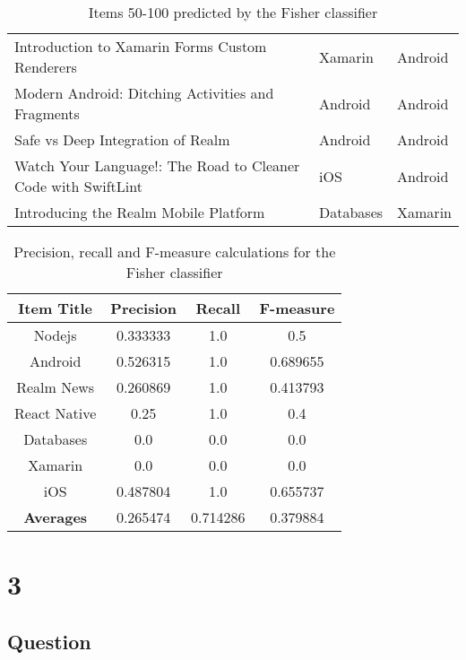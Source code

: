 \documentclass[letterpaper,11pt]{article}
\begin{document}
\begin{table}[h]
\begin{adjustbox}{max width=\linewidth}
\begin{tabular}{ | l | l | l |}
Introduction to Xamarin Forms Custom Renderers & Xamarin & Android \\ 
Modern Android: Ditching Activities and Fragments & Android & Android \\ 
Safe vs Deep Integration of Realm & Android & Android \\ 
Watch Your Language!: The Road to Cleaner Code with SwiftLint & iOS & Android \\ 
Introducing the Realm Mobile Platform & Databases & Xamarin \\ 
\hline
\end{tabular}
\end{adjustbox}
\caption{Items 50-100 predicted by the Fisher classifier}
\label{table:q2classified}
\end{table}

\begin{table}[h]
\centering
\begin{adjustbox}{max width=\linewidth}
\begin{tabular}{ | c | c | c | c |}
\hline
\textbf{Item Title} & \textbf{Precision} & \textbf{Recall} & \textbf{F-measure} \\
\hline
Nodejs & 0.333333 & 1.0 & 0.5 \\ 
Android & 0.526315 & 1.0 & 0.689655 \\ 
Realm News & 0.260869 & 1.0 & 0.413793 \\ 
React Native & 0.25 & 1.0 & 0.4 \\ 
Databases & 0.0 & 0.0 & 0.0 \\ 
Xamarin & 0.0 & 0.0 & 0.0 \\ 
iOS & 0.487804 & 1.0 & 0.655737 \\ 
\hline
\textbf{Averages} & 0.265474 & 0.714286 & 0.379884 \\
\hline
\end{tabular}
\end{adjustbox}
\caption{Precision, recall and F-measure calculations for the Fisher classifier}
\label{table:q2calcs}
\end{table}


\clearpage


\section*{3}

\subsection*{Question}
\end{document}

